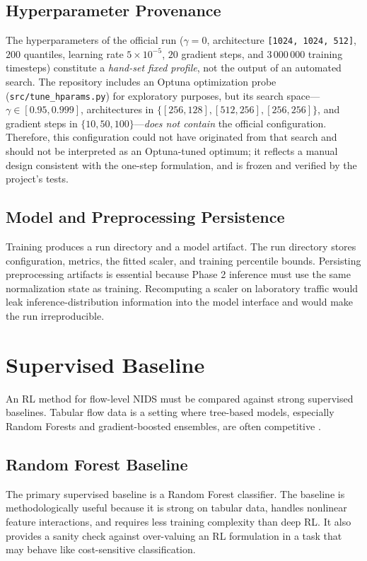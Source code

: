 \subsection{Hyperparameter Provenance}
The hyperparameters of the official run ($\gamma = 0$, architecture \texttt{[1024, 1024, 512]}, $200$ quantiles, learning rate $5\times10^{-5}$, $20$ gradient steps, and $3\,000\,000$ training timesteps) constitute a \emph{hand-set fixed profile}, not the output of an automated search. The repository includes an Optuna optimization probe (\texttt{src/tune\_hparams.py}) for exploratory purposes, but its search space---$\gamma \in [0.95, 0.999]$, architectures in $\{[256,128], [512,256], [256,256]\}$, and gradient steps in $\{10,50,100\}$---\emph{does not contain} the official configuration. Therefore, this configuration could not have originated from that search and should not be interpreted as an Optuna-tuned optimum; it reflects a manual design consistent with the one-step formulation, and is frozen and verified by the project's tests.

\subsection{Model and Preprocessing Persistence}
Training produces a run directory and a model artifact. The run directory stores configuration, metrics, the fitted scaler, and training percentile bounds. Persisting preprocessing artifacts is essential because Phase 2 inference must use the same normalization state as training. Recomputing a scaler on laboratory traffic would leak inference-distribution information into the model interface and would make the run irreproducible.

\section{Supervised Baseline}
An RL method for flow-level NIDS must be compared against strong supervised baselines. Tabular flow data is a setting where tree-based models, especially Random Forests and gradient-boosted ensembles, are often competitive \parencite{LiuLang2019IDSSurvey,Apruzzese2022CrossEvaluationNIDS}.

\subsection{Random Forest Baseline}
The primary supervised baseline is a Random Forest classifier. The baseline is methodologically useful because it is strong on tabular data, handles nonlinear feature interactions, and requires less training complexity than deep RL. It also provides a sanity check against over-valuing an RL formulation in a task that may behave like cost-sensitive classification.

